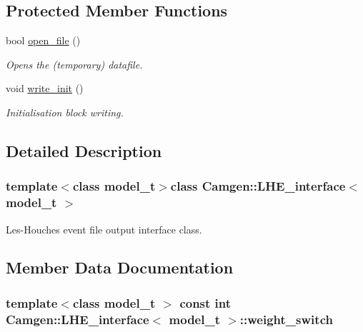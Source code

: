 \subsection*{Protected Member Functions}
\begin{DoxyCompactItemize}
\item 
\hypertarget{a00323_a67cf6b11cd11c9d97e7eda381024de55}{bool \hyperlink{a00323_a67cf6b11cd11c9d97e7eda381024de55}{open\-\_\-file} ()}\label{a00323_a67cf6b11cd11c9d97e7eda381024de55}

\begin{DoxyCompactList}\small\item\em Opens the (temporary) datafile. \end{DoxyCompactList}\item 
\hypertarget{a00323_a22cd41958e840759ec9912f53c081c1b}{void \hyperlink{a00323_a22cd41958e840759ec9912f53c081c1b}{write\-\_\-init} ()}\label{a00323_a22cd41958e840759ec9912f53c081c1b}

\begin{DoxyCompactList}\small\item\em Initialisation block writing. \end{DoxyCompactList}\end{DoxyCompactItemize}


\subsection{Detailed Description}
\subsubsection*{template$<$class model\-\_\-t$>$class Camgen\-::\-L\-H\-E\-\_\-interface$<$ model\-\_\-t $>$}

Les-\/\-Houches event file output interface class. 

\subsection{Member Data Documentation}
\hypertarget{a00323_a067bf1d9ce6ef519da53c80d422b89dd}{
\subsubsection[{weight\-\_\-switch}]{\setlength{\rightskip}{0pt plus 5cm}template$<$class model\-\_\-t $>$ const int {\bf Camgen\-::\-L\-H\-E\-\_\-interface}$<$ model\-\_\-t $>$\-::weight\-\_\-switch}}\label{a00323_a067bf1d9ce6ef519da53c80d422b89dd}


